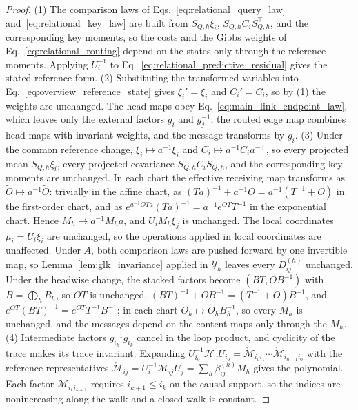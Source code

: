 \documentclass[twoside,11pt]{article}
\begin{document}
\begin{proof}
(1) The comparison laws of Eqs.~\eqref{eq:relational_query_law} and~\eqref{eq:relational_key_law} are built from $S_{Q,h}\xi_i$, $S_{Q,h}C_iS_{Q,h}^\top$, and the corresponding key moments, so the costs and the Gibbs weights of Eq.~\eqref{eq:relational_routing} depend on the states only through the reference moments. Applying $U_i^{-1}$ to Eq.~\eqref{eq:relational_predictive_residual} gives the stated reference form.
(2) Substituting the transformed variables into Eq.~\eqref{eq:overview_reference_state} gives $\xi_i'=\xi_i$ and $C_i'=C_i$, so by (1) the weights are unchanged. The head maps obey Eq.~\eqref{eq:main_link_endpoint_law}, which leaves only the external factors $g_i$ and $g_j^{-1}$; the routed edge map combines head maps with invariant weights, and the message transforms by $g_i$.
(3) Under the common reference change, $\xi_i\mapsto a^{-1}\xi_i$ and $C_i\mapsto a^{-1}C_ia^{-\top}$, so every projected mean $S_{Q,h}\xi_i$, every projected covariance $S_{Q,h}C_iS_{Q,h}^\top$, and the corresponding key moments are unchanged. In each chart the effective receiving map transforms as $\widetilde O\mapsto a^{-1}\widetilde O$: trivially in the affine chart, as $(Ta)^{-1}+a^{-1}O=a^{-1}(T^{-1}+O)$ in the first-order chart, and as $e^{a^{-1}OTa}(Ta)^{-1}=a^{-1}e^{OT}T^{-1}$ in the exponential chart. Hence $M_h\mapsto a^{-1}M_ha$, and $U_iM_h\xi_j$ is unchanged. The local coordinates $\mu_i=U_i\xi_i$ are unchanged, so the operations applied in local coordinates are unaffected. Under $A$, both comparison laws are pushed forward by one invertible map, so Lemma~\ref{lem:glk_invariance} applied in $\mathcal Y_h$ leaves every $D_{ij}^{(h)}$ unchanged. Under the headwise change, the stacked factors become $(BT,OB^{-1})$ with $B=\bigoplus_hB_h$, so $OT$ is unchanged, $(BT)^{-1}+OB^{-1}=(T^{-1}+O)B^{-1}$, and $e^{OT}(BT)^{-1}=e^{OT}T^{-1}B^{-1}$; in each chart $\widetilde O_h\mapsto\widetilde O_hB_h^{-1}$, so every $M_h$ is unchanged, and the messages depend on the content maps only through the $M_h$.
(4) Intermediate factors $g_{i_k}^{-1}g_{i_k}$ cancel in the loop product, and cyclicity of the trace makes its trace invariant. Expanding $U_{i_0}^{-1}\mathcal H_\gamma U_{i_0}=\mathring{\mathcal M}_{i_0i_1}\cdots\mathring{\mathcal M}_{i_{n-1}i_0}$ with the reference representatives $\mathring{\mathcal M}_{ij}=U_i^{-1}\mathcal M_{ij}U_j=\sum_h\beta_{ij}^{(h)}M_h$ gives the polynomial. Each factor $\mathcal M_{i_ki_{k+1}}$ requires $i_{k+1}\le i_k$ on the causal support, so the indices are nonincreasing along the walk and a closed walk is constant.
\end{proof}
\end{document}
